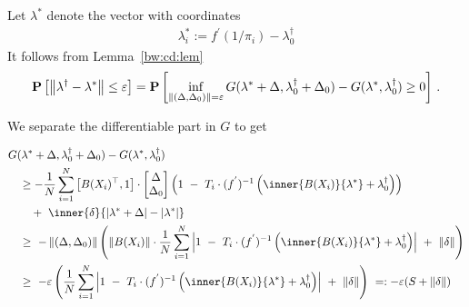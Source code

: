 Let $\lambda^*$ denote the vector with coordinates
\begin{gather}
  \lambda^*_i
  :=
  f^{'}(1/\pi_i)
  -
  \lambda^\dagger_0
\end{gather}
It follows from Lemma~\ref{bw:cd:lem}
 \begin{gather*}
   \mathbf{P}
   \left[ 
     \left\lVert
      \lambda ^ \dagger
      -
      \lambda^*
     \right\rVert
     \le
     \varepsilon
   \right]
   =
   \mathbf{P}
   \left[ 
     \inf _ { 
       \left\lVert
         (
     \Delta
     ,
     \Delta_0
         )
 \right\rVert 
= \varepsilon }
     G
     (
     \lambda^*
      +
      \Delta
      ,
      \lambda^\dagger_0
      +
     \Delta_0
     )
     -
     G
     (
     \lambda^*,
      \lambda^\dagger_0
     )
     \ge 
     0
   \right]
   \,.
 \end{gather*}
 
 We separate the differentiable part in $G$ to get

 \begin{align*}
   &
   G
     (
     \lambda^*
      +
      \Delta
      ,
      \lambda^\dagger_0
      +
     \Delta_0
     )
     -
     G
     (
     \lambda^*,
      \lambda^\dagger_0
     )
     \\
     &
     \quad
     \ge
     -
     \frac{1}{N}
     \sum_{i=1}^{N} 
     \left[ 
       B(X_i)^\top,
       1
     \right]
     \cdot
     \begin{bmatrix}
       \Delta\\
       \Delta_0
     \end{bmatrix}
     \left( 
       1
       \ 
       -
       \ 
     T_i
     \cdot
     (f^{'})^{-1}
     \left( 
       \inner
       {B(X_i)}
       {\lambda^*}
       +
      \lambda^\dagger_0
     \right)
     \right)
     \\
     &
     \qquad
     +
     \ 
     \inner
     {\delta}
     {
       |\lambda^*+\Delta|
       -
       |\lambda^*|
     }
     \\
     &
     \quad
     \ge
     \ 
     -
       \norm{
         (
     \Delta
     ,
     \Delta_0
         )
 } 
     \left( 
     \norm{B(X_i)}
     \cdot
     \frac{1}{N}
     \sum_{i=1}^{N} 
     \left| 
       1
       \ 
       -
       \ 
     T_i
     \cdot
     (f^{'})^{-1}
     \left( 
       \inner
       {B(X_i)}
       {\lambda^*}
       +
      \lambda^\dagger_0
     \right)
     \right|
     \ 
     +
     \ 
     \norm{\delta}
     \right)
     \\
     &
     \quad
     \ge
     \ 
     -
     \varepsilon
     \left( 
     \frac{1}{N}
     \sum_{i=1}^{N} 
     \left| 
       1
       \ 
       -
       \ 
     T_i
     \cdot
     (f^{'})^{-1}
     \left( 
       \inner
       {B(X_i)}
       {\lambda^*}
       +
      \lambda^\dagger_0
     \right)
     \right|
     \ 
     +
     \ 
     \norm{\delta}
     \right)
     \ 
     =:
     -\varepsilon
     (S+\norm{\delta})
 \end{align*}
